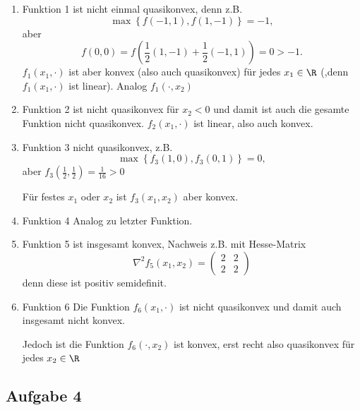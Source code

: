 \begin{enumerate}[label=\arabic{enumi}):]
	\item Funktion 1 ist nicht einmal quasikonvex, denn z.B.
		\[
			\max\limits_{}\left\{ f(-1,1), f(1,-1) \right\}  = -1
		,\] 
		aber
		\[
			f(0,0) = f(\frac{1}{2}(1,-1) + \frac{1}{2}(-1,1)) = 0 > -1
		.\] 
	 $f_1(x_1,\cdot)$ ist aber konvex (also auch quasikonvex) für jedes $x_1 \in \R$ (,denn $f_1(x_1, \cdot)$ ist linear). Analog $f_1(\cdot,x_2)$

	 \item Funktion 2 ist nicht quasikonvex für $x_2<0$ und damit ist auch die gesamte Funktion nicht quasikonvex.
		 $f_{2}(x_1, \cdot)$ ist linear, also auch konvex.
	\item Funktion 3 nicht quasikonvex, z.B.
		\[
			\max\limits_{}\left\{ f_3(1,0), f_3(0,1) \right\} = 0
		,\] 
		aber $f_3(\frac{1}{2},\frac{1}{2})=\frac{1}{16}> 0$

		Für festes $x_1$ oder $x_2$ ist $f_3(x_1,x_2)$ aber konvex.
	\item Funktion 4 Analog zu letzter Funktion.
	\item Funktion 5 ist insgesamt konvex, Nachweis z.B. mit Hesse-Matrix
		\[
			\nabla ^2f_5(x_1,x_2) = \begin{pmatrix}
				2 & 2 \\ 2 & 2
			\end{pmatrix}
		\] 
		denn diese ist positiv semidefinit.
	\item Funktion 6 Die Funktion $f_6(x_1, \cdot)$ ist nicht quasikonvex und damit auch insgesamt nicht konvex.

		Jedoch ist die Funktion $f_6(\cdot, x_2)$ ist konvex, erst recht also quasikonvex für jedes $x_2 \in \R$
\end{enumerate}



\subsection*{Aufgabe 4}
\label{sec:Aufgabe 4}

